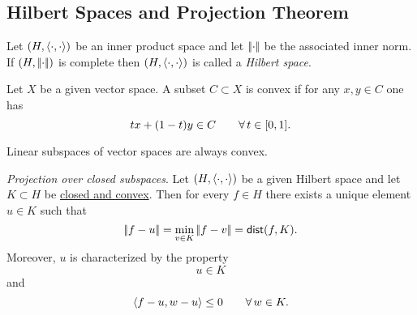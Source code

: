 \documentclass{article}
\begin{document}
\subsection{Hilbert Spaces and Projection Theorem}
\begin{definition}
	Let $\left(H,\langle \cdot,\cdot \rangle\right)$ be an inner product space and let $\left|\negthinspace\left|\cdot\right|\negthinspace\right|$ be the associated inner norm. If $(H,\left|\negthinspace\left|\cdot\right|\negthinspace\right|)$ is complete then $\left(H,\langle \cdot,\cdot \rangle\right)$ is called a \emph{Hilbert space}.
\end{definition}
\begin{definition}
	Let $X$ be a given vector space. A subset $C\subset X$ is convex if for any $x,y\in C$ one has
	\begin{equation*}
		tx+(1-t)y\in C\qquad\forall\, t\in[0,1].
	\end{equation*}
\end{definition}
Linear subspaces of vector spaces are always convex.
\begin{theorem}
	\emph{Projection over closed subspaces}. Let $(H,\langle \cdot,\cdot \rangle)$ be a given Hilbert space and let $K\subset H$ be \underline{closed and convex}. Then for every $f\in H$ there exists a unique element $u\in K$ such that
	\begin{equation*}
		\left|\negthinspace\left|f-u\right|\negthinspace\right|=\min_{v\in K}\left|\negthinspace\left|f-v\right|\negthinspace\right|=\mathsf{dist}({f,K}).
	\end{equation*}
	Moreover, $u$ is characterized by the property
	\begin{equation*}
		u\in K
	\end{equation*}
	and 
	\begin{equation*}
		\langle f-u,w-u\rangle\leq0\qquad\forall\, w\in K.
	\end{equation*}
\end{theorem}
\end{document}
